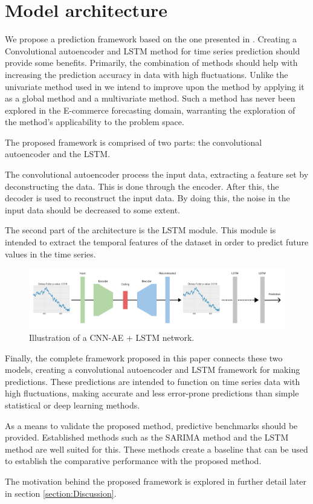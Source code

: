 \section{Model architecture}
\label{section:Architecture:Model}

We propose a prediction framework based on the one presented in \cite{Zhao2019}.
Creating a Convolutional autoencoder and LSTM method for time series prediction should provide some benefits.
Primarily, the combination of methods should help with increasing the prediction accuracy in data with high fluctuations.
Unlike the univariate method used in \cite{Zhao2019} we intend to improve upon the method by applying it as a global method and a multivariate method.
Such a method has never been explored in the E-commerce forecasting domain, warranting the exploration of the method's applicability to the problem space.

The proposed framework is comprised of two parts: the convolutional autoencoder and the LSTM.

The convolutional autoencoder process the input data, extracting a feature set by deconstructing the data.
This is done through the encoder. After this, the decoder is used to reconstruct the input data.
By doing this, the noise in the input data should be decreased to some extent.

The second part of the architecture is the LSTM module.
This module is intended to extract the temporal features of the dataset
in order to predict future values in the time series.

\begin{figure}[h!]
    \centering
    \includegraphics[width=\textwidth]{./sections/Architecture/figures/CNN-AE + LSTM.png}
    \hfill
    \caption{Illustration of a CNN-AE + LSTM network.}
    \label{fig:stacked_autoencoder_arch}
\end{figure}

Finally, the complete framework proposed in this paper connects these two models,
creating a convolutional autoencoder and LSTM framework for making predictions.
These predictions are intended to function on time series data with high fluctuations,
making accurate and less error-prone predictions than simple statistical or deep learning methods.


As a means to validate the proposed method, predictive benchmarks should be provided.
Established methods such as the SARIMA method and the LSTM method are well suited for this.
These methods create a baseline that can be used to establish the comparative performance with the proposed method.

The motivation behind the proposed framework is explored in further detail later in section \ref{section:Discussion}.

